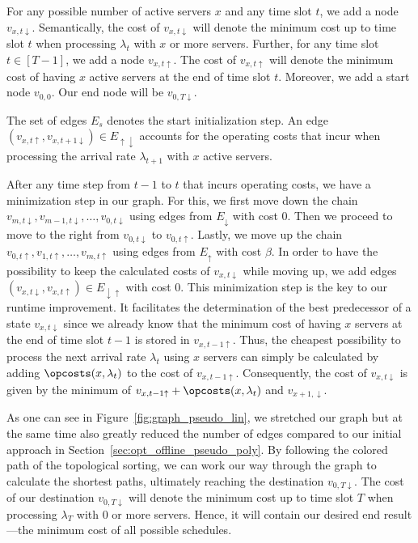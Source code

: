 For any possible number of active servers $x$ and any time slot $t$, we add a node $v_{x,t\downarrow}$. Semantically, the cost of $v_{x,t\downarrow}$ will denote the minimum cost up to time slot $t$ when processing $\lambda_t$ with $x$ or more servers. Further, for any time slot $t\in[T-1]$, we add a node $v_{x,t\uparrow}$. The cost of $v_{x,t\uparrow}$ will denote the minimum cost of having $x$ active servers at the end of time slot $t$. Moreover, we add a start node $v_{0,0}$. Our end node will be $v_{0,T\downarrow}$.

The set of edges $E_s$ denotes the start initialization step. An edge $(v_{x,t\uparrow},v_{x,t+1\downarrow})\in E_{\uparrow\downarrow}$ accounts for the operating costs that incur when processing the arrival rate $\lambda_{t+1}$ with $x$ active servers.

After any time step from $t-1$ to $t$ that incurs operating costs, we have a minimization step in our graph. For this, we first move down the chain $v_{m,t\downarrow},v_{m-1,t\downarrow},\dotsc,v_{0,t\downarrow}$ using edges from $E_\downarrow$ with cost $0$. Then we proceed to move to the right from $v_{0,t\downarrow}$ to $v_{0,t\uparrow}$. Lastly, we move up the chain $v_{0,t\uparrow},v_{1,t\uparrow},\dotsc,v_{m,t\uparrow}$ using edges from $E_\uparrow$ with cost $\beta$. In order to have the possibility to keep the calculated costs of $v_{x,t\downarrow}$ while moving up, we add edges $(v_{x,t\downarrow},v_{x,t\uparrow})\in E_{\downarrow\uparrow}$ with cost $0$.  
This minimization step is the key to our runtime improvement. It facilitates the determination of the best predecessor of a state $v_{x,t\downarrow}$ since we already know that the minimum cost of having $x$ servers at the end of time slot $t-1$ is stored in $v_{x,t-1\uparrow}$. Thus, the cheapest possibility to process the next arrival rate $\lambda_t$ using $x$ servers can simply be calculated by adding $\opcosts(x,\lambda_t)$ to the cost of $v_{x,t-1\uparrow}$. Consequently, the cost of $v_{x,t\downarrow}$ is given by the minimum of $v_{x,t-1\uparrow}+\opcosts(x,\lambda_t)$ and $v_{x+1,\downarrow}$.

As one can see in Figure~\ref{fig:graph_pseudo_lin}, we stretched our graph but at the same time also greatly reduced the number of edges compared to our initial approach in Section~\ref{sec:opt_offline_pseudo_poly}. By following the colored path of the topological sorting, we can work our way through the graph to calculate the shortest paths, ultimately reaching the destination $v_{0,T\downarrow}$. The cost of our destination $v_{0,T\downarrow}$ will denote the minimum cost up to time slot $T$ when processing $\lambda_T$ with 0 or more servers. Hence, it will contain our desired end result---the minimum cost of all possible schedules.

